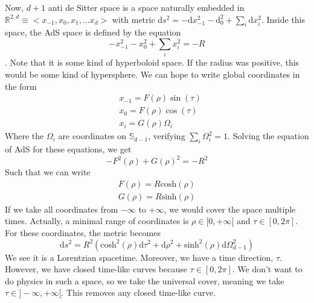 \documentclass[a4paper]{book}
\theoremstyle{definition}
\theoremstyle{remark}
\begin{document}
Now, $d+1$ anti de Sitter space is a space naturally embedded in $\mathbb{R}^{2,d} \equiv <x_{-1}, x_0, x_1,\dots x_d>$ with metric $\text{d}s^2 = -\text{d}x_{-1}^2 - \text{d}_{0}^2 + \sum_i \text{d}x_i^2$. Inside this space, the AdS space is defined by the equation 
\begin{equation}
    - x_{-1}^2 - x_0 ^2 + \sum_i x_i^2 = -R
\end{equation}. 
Note that it is some kind of hyperboloid space. If the radius was positive, this would be some kind of hypersphere. We can hope to write global coordinates in the form 
\begin{equation}
    \begin{aligned}
        &x_{-1} = F(\rho)\sin (\tau) \\ 
        &x_0 = F(\rho) \cos(\tau) \\ 
        &x_i = G(\rho) \Omega_i
    \end{aligned}
\end{equation}
Where the $\Omega_i$ are coordinates on $\mathbb{S}_{d-1}$, verifying $\sum_i \Omega_i ^2 = 1$. Solving the equation of AdS for these equations, we get 
\begin{equation}
        -F^2(\rho) + G(\rho)^2 = -R^2
\end{equation}
Such that we can write 
\begin{equation}
    \begin{aligned}
        F(\rho) = R\text{cosh}(\rho) \\ 
        G(\rho) = R\text{sinh}(\rho)
    \end{aligned}
\end{equation}
If we take all coordinates from $-\infty$ to $+\infty$, we would cover the space multiple times. Actually, a minimal range of coordinates is $\rho \in [0, +\infty[$ and $\tau \in [0, 2\pi]$. For these coordinates, the metric becomes 
\begin{equation}
    \text{d}s^2 = R^2\left(\text{cosh}^2(\rho)\text{d}\tau^2 + \text{d}\rho ^2 + \text{sinh}^2(\rho) \text{d}\Omega_{d-1}^2\right)
\end{equation}
We see it is a Lorentzian spacetime. Moreover, we have a time direction, $\tau$. However, we have closed time-like curves because $\tau \in [0, 2\pi]$. We don't want to do physics in such a space, so we take the universal cover, meaning we take $\tau \in ]-\infty, +\infty[$. This removes any closed time-like curve. \par \medskip 
\end{document}
